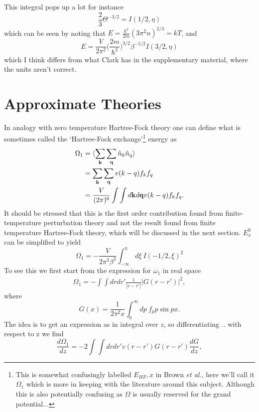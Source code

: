 \documentclass[11pt,twosided]{article}
\begin{document}
This integral pops up a lot for instance
\begin{equation}
    \frac{2}{3}\Theta^{-3/2} = I(1/2,\eta)
\end{equation}
which can be seen by noting that $E = \frac{\hbar^2}{2m} (3 \pi^2 n)^{2/3} = kT$, and
\begin{equation}
    E = \frac{V}{2\pi^2}\Big(\frac{2m}{\hbar^2}\Big)^{3/2} \beta^{-5/2} I(3/2,\eta)
\end{equation}
which I think differs from what Clark has in the supplementary material, where the units aren't correct.
\section{Approximate Theories}
In analogy with zero temperature Hartree-Fock theory one can define what is sometimes called the `Hartree-Fock exchange'\footnote{This is somewhat confusingly labelled $E_{HF},x$ in Brown \emph{et al.}, here we'll call it $\Omega_1$ which is more in keeping with the literature around this subject. Although this is also potentially confusing as $\Omega$ is usually reserved for the grand potential...} energy as
\begin{align}
\Omega_1 &= \langle \sum_{\mathbf{k}} \sum_{\mathbf{q}} \hat{n}_k \hat{n}_q \rangle\\
	  &=  \sum_{\mathbf{k}} \sum_{\mathbf{q}} v(k-q) f_k f_q\\
	  &= \frac{V}{(2\pi)^6}\int\int d\mathbf{k}d\mathbf{q} v(k-q) f_k f_q.
\end{align}
It should be stressed that this is the first order contribution found from finite-temperature perturbation theory and not the result found from finite temperature Hartree-Fock theory, which will be discussed in the next section.
$E_x^0$ can be simplified to yield
\begin{equation}
\Omega_1 = -\frac{V}{2\pi^3\beta^2}\int_{-\infty}^{\eta} d\xi \ I(-1/2, \xi)^2
\end{equation}
To see this we first start from the expression for $\omega_1$ in real space
\begin{align}
\Omega_1 = - \int \int dr dr' \frac{1}{|r-r'|} |G(r-r')|^2,
\end{align}
where
\begin{equation}
G(x) = \frac{1}{2\pi^2x}\int_0^{\infty} dp \ f_p p \sin px.
\end{equation}
The idea is to get an expression as in integral over $z$, so differentiating .. with respect to z we find
\begin{equation}
\frac{d\Omega_1}{dz} = - 2\int \int dr dr' v(r-r') G(r-r')\frac{dG}{dz},
\end{equation}
\end{document}

